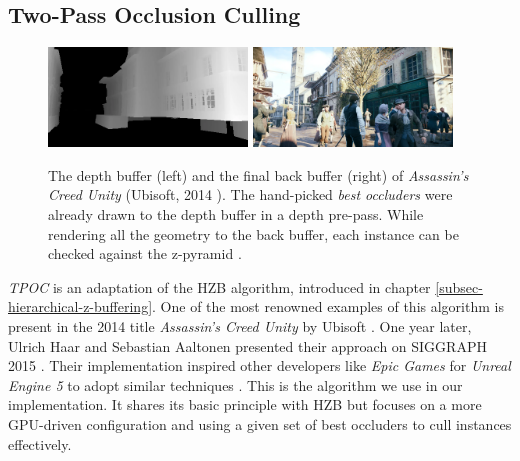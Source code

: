 \subsection{Two-Pass Occlusion Culling} \label{subsec-two-pass-occlusion-culling}

\begin{figure}[h]
    \centering
    \includegraphics[width=200px]{images/graphics/depth-buffer-ac-unity.png}
    \includegraphics[width=200px]{images/graphics/final-frame-ac-unity.png}
    \caption{The depth buffer (left) and the final back buffer (right) of \emph{Assassin's Creed Unity} (Ubisoft, 2014 \cite{Ubisoft2014}). 
    The hand-picked \emph{best occluders} were already drawn to the depth buffer in a depth pre-pass.
    While rendering all the geometry to the back buffer, each instance can be checked against the z-pyramid \cite{Kruskonja2022}.}
    \label{fig:depth-buffer-ac-unity}
\end{figure}

\noindent
\emph{\ac{TPOC}} is an adaptation of the \ac{HZB} algorithm, introduced in chapter \ref{subsec-hierarchical-z-buffering}. 
One of the most renowned examples of this algorithm is present in the 2014 title \emph{Assassin's Creed Unity} by Ubisoft 
\cite{Ubisoft2014}. One year later, Ulrich Haar and Sebastian Aaltonen presented their approach on SIGGRAPH 2015 
\cite{Aaltonen2015}. Their implementation inspired other developers like \emph{Epic Games} for \emph{Unreal Engine 5} 
to adopt similar techniques \cite{Karis2021}. This is the algorithm we use in our implementation. It shares its basic 
principle with \ac{HZB} but focuses on a more \ac{GPU}-driven configuration and using a given set of best occluders to 
cull instances effectively. \\


